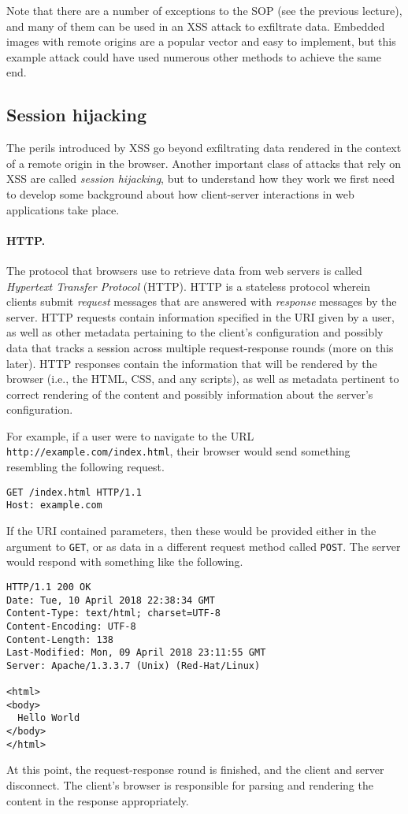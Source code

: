 \documentclass[11pt,twoside]{scrartcl}
\begin{document}
Note that there are a number of exceptions to the SOP (see the previous lecture), and many of them can be used in an XSS attack to exfiltrate data. Embedded images with remote origins are a popular vector and easy to implement, but this example attack could have used numerous other methods to achieve the same end.

\subsection{Session hijacking}
The perils introduced by XSS go beyond exfiltrating data rendered in the context of a remote origin in the browser. Another important class of attacks that rely on XSS are called \emph{session hijacking}, but to understand how they work we first need to develop some background about how client-server interactions in web applications take place.

\paragraph{HTTP.} The protocol that browsers use to retrieve data from web servers is called \emph{Hypertext Transfer Protocol} (HTTP). HTTP is a stateless protocol wherein clients submit \emph{request} messages that are answered with \emph{response} messages by the server. HTTP requests contain information specified in the URI given by a user, as well as other metadata pertaining to the client's configuration and possibly data that tracks a session across multiple request-response rounds (more on this later). HTTP responses contain the information that will be rendered by the browser (i.e., the HTML, CSS, and any scripts), as well as metadata pertinent to correct rendering of the content and possibly information about the server's configuration.

For example, if a user were to navigate to the URL \verb'http://example.com/index.html', their browser would send something resembling the following request.
\begin{verbatim}
GET /index.html HTTP/1.1
Host: example.com
\end{verbatim}
If the URI contained parameters, then these would be provided either in the argument to \verb'GET', or as data in a different request method called \verb'POST'. The server would respond with something like the following.
\begin{verbatim}
HTTP/1.1 200 OK
Date: Tue, 10 April 2018 22:38:34 GMT
Content-Type: text/html; charset=UTF-8
Content-Encoding: UTF-8
Content-Length: 138
Last-Modified: Mon, 09 April 2018 23:11:55 GMT
Server: Apache/1.3.3.7 (Unix) (Red-Hat/Linux)

<html>
<body>
  Hello World
</body>
</html>
\end{verbatim}
At this point, the request-response round is finished, and the client and server disconnect. The client's browser is responsible for parsing and rendering the content in the response appropriately.
\end{document}
